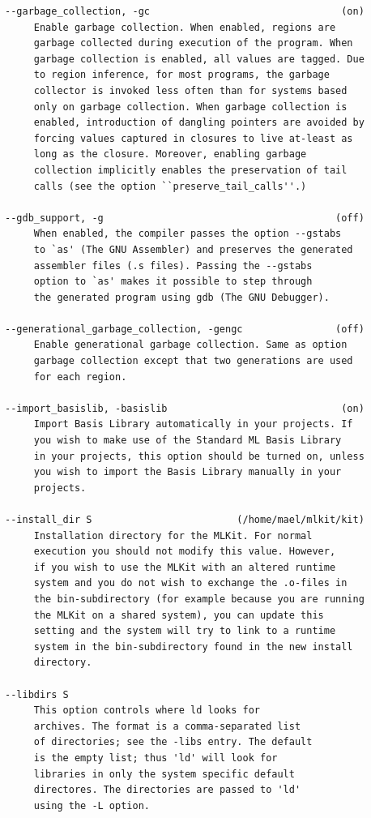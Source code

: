 \documentclass[12pt]{book}
\begin{document}
\begin{verbatim}
--garbage_collection, -gc                                 (on)
     Enable garbage collection. When enabled, regions are
     garbage collected during execution of the program. When
     garbage collection is enabled, all values are tagged. Due
     to region inference, for most programs, the garbage
     collector is invoked less often than for systems based
     only on garbage collection. When garbage collection is
     enabled, introduction of dangling pointers are avoided by
     forcing values captured in closures to live at-least as
     long as the closure. Moreover, enabling garbage
     collection implicitly enables the preservation of tail
     calls (see the option ``preserve_tail_calls''.)

--gdb_support, -g                                        (off)
     When enabled, the compiler passes the option --gstabs
     to `as' (The GNU Assembler) and preserves the generated
     assembler files (.s files). Passing the --gstabs
     option to `as' makes it possible to step through
     the generated program using gdb (The GNU Debugger).

--generational_garbage_collection, -gengc                (off)
     Enable generational garbage collection. Same as option
     garbage collection except that two generations are used
     for each region.

--import_basislib, -basislib                              (on)
     Import Basis Library automatically in your projects. If 
     you wish to make use of the Standard ML Basis Library
     in your projects, this option should be turned on, unless
     you wish to import the Basis Library manually in your
     projects.

--install_dir S                         (/home/mael/mlkit/kit)
     Installation directory for the MLKit. For normal
     execution you should not modify this value. However,
     if you wish to use the MLKit with an altered runtime
     system and you do not wish to exchange the .o-files in
     the bin-subdirectory (for example because you are running
     the MLKit on a shared system), you can update this
     setting and the system will try to link to a runtime
     system in the bin-subdirectory found in the new install
     directory.

--libdirs S 
     This option controls where ld looks for
     archives. The format is a comma-separated list
     of directories; see the -libs entry. The default
     is the empty list; thus 'ld' will look for
     libraries in only the system specific default
     directores. The directories are passed to 'ld'
     using the -L option.


\end{verbatim}
\end{document}
